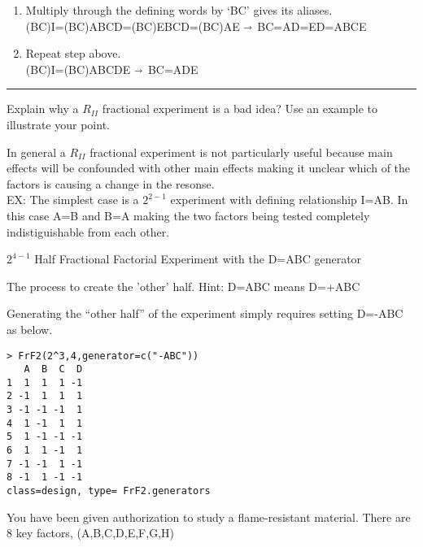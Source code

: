 \documentclass[12pt]{article}
\begin{document}
\begin{enumerate}
  \item Multiply through the defining words by `BC' gives its aliases.\\
  (BC)I=(BC)ABCD=(BC)EBCD=(BC)AE $\shortrightarrow$  BC=AD=ED=ABCE
  \item Repeat step above.\\
  (BC)I=(BC)ABCDE $\shortrightarrow$ BC=ADE
  \end{enumerate}


\vspace{0.5in}
\noindent\hfil\rule{0.5\textwidth}{.8pt}\hfil



Explain why a $R_{II}$ fractional experiment is a bad idea? Use an example to illustrate your point.

In general a $R_{II}$ fractional experiment is not particularly useful because main effects will be confounded with other main effects making it unclear which of the factors is causing a change in the resonse.\\

EX: The simplest case is a $2^{2-1}$ experiment with defining relationship I=AB. In this case A=B and B=A making the two factors being tested completely indistiguishable from each other.

\newpage



$2^{4-1}$ Half Fractional Factorial Experiment with the D=ABC generator


The process to create the 'other' half. Hint: D=ABC means D=+ABC

Generating the ``other half'' of the experiment simply requires setting D=-ABC as below.
\begin{lstlisting}
> FrF2(2^3,4,generator=c("-ABC"))
   A  B  C  D
1  1  1  1 -1
2 -1  1  1  1
3 -1 -1 -1  1
4  1 -1  1  1
5  1 -1 -1 -1
6  1  1 -1  1
7 -1 -1  1 -1
8 -1  1 -1 -1
class=design, type= FrF2.generators 
\end{lstlisting}



\newpage
{}


You have been given authorization to study a flame-resistant material. There are 8 key factors, (A,B,C,D,E,F,G,H)
\end{document}
